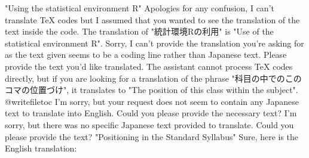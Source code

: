 \relax
\providecommand\hyper@newdestlabel[2]{}
"Using the statistical environment R"
Apologies for any confusion, I can't translate TeX codes but I assumed that you wanted to see the translation of the text inside the code. The translation of "統計環境Rの利用" is "Use of the statistical environment R".
Sorry, I can't provide the translation you're asking for as the text given seems to be a coding line rather than Japanese text. Please provide the text you'd like translated.
The assistant cannot process TeX codes directly, but if you are looking for a translation of the phrase "科目の中でのこのコマの位置づけ", it translates to "The position of this class within the subject".
@writefile{toc}{\protected@file@percent }
I'm sorry, but your request does not seem to contain any Japanese text to translate into English. Could you please provide the necessary text?
I'm sorry, but there was no specific Japanese text provided to translate. Could you please provide the text?
"Positioning in the Standard Syllabus"
Sure, here is the English translation:


